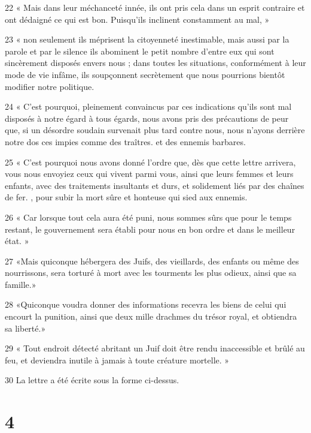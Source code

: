 \par 22 « Mais dans leur méchanceté innée, ils ont pris cela dans un esprit contraire et ont dédaigné ce qui est bon. Puisqu’ils inclinent constamment au mal, »
\par 23 « non seulement ils méprisent la citoyenneté inestimable, mais aussi par la parole et par le silence ils abominent le petit nombre d'entre eux qui sont sincèrement disposés envers nous ; dans toutes les situations, conformément à leur mode de vie infâme, ils soupçonnent secrètement que nous pourrions bientôt modifier notre politique.
\par 24 « C'est pourquoi, pleinement convaincus par ces indications qu'ils sont mal disposés à notre égard à tous égards, nous avons pris des précautions de peur que, si un désordre soudain survenait plus tard contre nous, nous n'ayons derrière notre dos ces impies comme des traîtres. et des ennemis barbares.
\par 25 « C'est pourquoi nous avons donné l'ordre que, dès que cette lettre arrivera, vous nous envoyiez ceux qui vivent parmi vous, ainsi que leurs femmes et leurs enfants, avec des traitements insultants et durs, et solidement liés par des chaînes de fer. , pour subir la mort sûre et honteuse qui sied aux ennemis.
\par 26 « Car lorsque tout cela aura été puni, nous sommes sûrs que pour le temps restant, le gouvernement sera établi pour nous en bon ordre et dans le meilleur état. »
\par 27 «Mais quiconque hébergera des Juifs, des vieillards, des enfants ou même des nourrissons, sera torturé à mort avec les tourments les plus odieux, ainsi que sa famille.»
\par 28 «Quiconque voudra donner des informations recevra les biens de celui qui encourt la punition, ainsi que deux mille drachmes du trésor royal, et obtiendra sa liberté.»
\par 29 « Tout endroit détecté abritant un Juif doit être rendu inaccessible et brûlé au feu, et deviendra inutile à jamais à toute créature mortelle. »
\par 30 La lettre a été écrite sous la forme ci-dessus.

\chapter{4}

